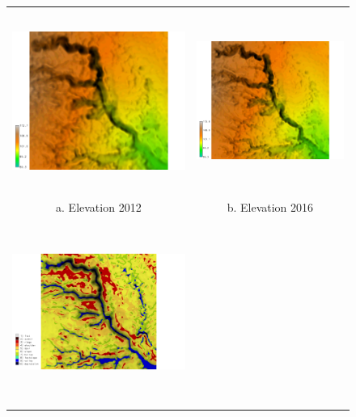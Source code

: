 \documentclass[final,3p,times,twocolumn]{elsarticle}
\newcommand{\ra}[1]{\renewcommand{\arraystretch}{#1}}
\begin{document}
\begin{figure}[h]
\small\sf\centering
\ra{1.3}
\begin{tabular}{m{} m{}}
%
%
\multicolumn{1}{c}{\includegraphics[height=60mm]{../images/sample_data/gully_elevation_2012.png}} &
\multicolumn{1}{c}{\includegraphics[height=60mm]{../images/sample_data/gully_elevation_2016.png}}\\
\multicolumn{1}{c}{a. Elevation 2012} & \multicolumn{1}{c}{b. Elevation 2016}\\
%
\includegraphics[height=60mm,center]{../images/sample_data/gully_landforms_2012.png} &

\end{tabular}
\end{figure}
\end{document}
